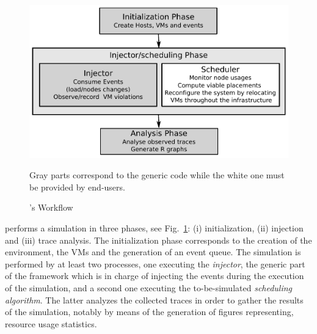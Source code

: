 \begin{figure}
\centering
\vspace*{-.6cm}
\includegraphics[width=.99\linewidth]{figures/VMPlaceS-workflow.pdf}
\vspace*{-.5cm}
\caption{\vmps's Workflow}
\flushleft \scriptsize{Gray parts correspond to the generic code while the white one
  must be provided by end-users. %
}
\vspace*{-.8cm}
\label{fig:workflow}
\end{figure}
%
\vmps performs a simulation in three phases, see
Fig.~\ref{fig:workflow}: (i) initialization, (ii) injection and (iii)
trace analysis.  The initialization phase corresponds to the creation
of the environment, the VMs and the generation of an event queue.
%
The simulation is performed by at least two \sg processes, one
executing the \emph{injector}, the generic part of the framework which
is in charge of injecting the events during the execution of the
simulation, and a second one executing the to-be-simulated
\emph{scheduling algorithm}.
%
The latter analyzes the collected traces in order to gather the
results of the simulation, notably by means of the generation of
figures representing, \eg resource usage statistics.

